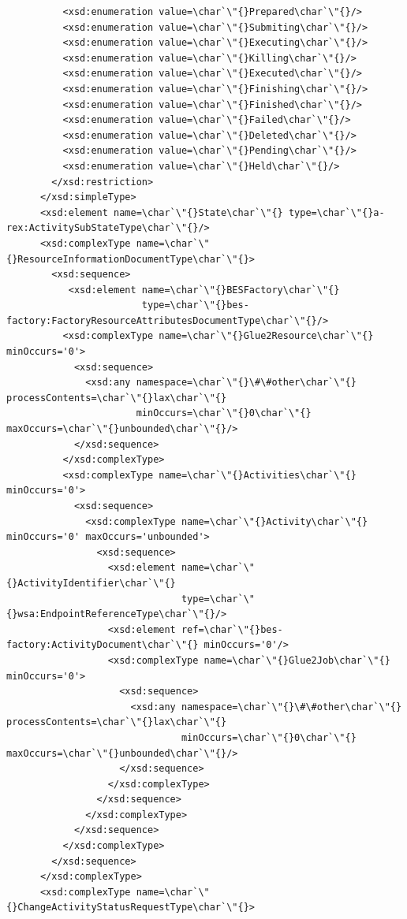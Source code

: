\documentclass{article}                            %
\begin{document}
\begin{footnotesize}
\begin{verbatim}
          <xsd:enumeration value=\char`\"{}Prepared\char`\"{}/>
          <xsd:enumeration value=\char`\"{}Submiting\char`\"{}/>
          <xsd:enumeration value=\char`\"{}Executing\char`\"{}/>
          <xsd:enumeration value=\char`\"{}Killing\char`\"{}/>
          <xsd:enumeration value=\char`\"{}Executed\char`\"{}/>
          <xsd:enumeration value=\char`\"{}Finishing\char`\"{}/>
          <xsd:enumeration value=\char`\"{}Finished\char`\"{}/>
          <xsd:enumeration value=\char`\"{}Failed\char`\"{}/>
          <xsd:enumeration value=\char`\"{}Deleted\char`\"{}/>
          <xsd:enumeration value=\char`\"{}Pending\char`\"{}/>
          <xsd:enumeration value=\char`\"{}Held\char`\"{}/>
        </xsd:restriction>
      </xsd:simpleType>
      <xsd:element name=\char`\"{}State\char`\"{} type=\char`\"{}a-rex:ActivitySubStateType\char`\"{}/>
      <xsd:complexType name=\char`\"{}ResourceInformationDocumentType\char`\"{}>
        <xsd:sequence>
           <xsd:element name=\char`\"{}BESFactory\char`\"{}
                        type=\char`\"{}bes-factory:FactoryResourceAttributesDocumentType\char`\"{}/>
          <xsd:complexType name=\char`\"{}Glue2Resource\char`\"{} minOccurs='0'>
            <xsd:sequence>
              <xsd:any namespace=\char`\"{}\#\#other\char`\"{} processContents=\char`\"{}lax\char`\"{}
                       minOccurs=\char`\"{}0\char`\"{} maxOccurs=\char`\"{}unbounded\char`\"{}/>
            </xsd:sequence>
          </xsd:complexType>
          <xsd:complexType name=\char`\"{}Activities\char`\"{} minOccurs='0'>
            <xsd:sequence>
              <xsd:complexType name=\char`\"{}Activity\char`\"{} minOccurs='0' maxOccurs='unbounded'>
                <xsd:sequence>
                  <xsd:element name=\char`\"{}ActivityIdentifier\char`\"{}
                               type=\char`\"{}wsa:EndpointReferenceType\char`\"{}/>
                  <xsd:element ref=\char`\"{}bes-factory:ActivityDocument\char`\"{} minOccurs='0'/>
                  <xsd:complexType name=\char`\"{}Glue2Job\char`\"{} minOccurs='0'>
                    <xsd:sequence>
                      <xsd:any namespace=\char`\"{}\#\#other\char`\"{} processContents=\char`\"{}lax\char`\"{}
                               minOccurs=\char`\"{}0\char`\"{} maxOccurs=\char`\"{}unbounded\char`\"{}/>
                    </xsd:sequence>
                  </xsd:complexType>
                </xsd:sequence>
              </xsd:complexType>
            </xsd:sequence>
          </xsd:complexType>
        </xsd:sequence>
      </xsd:complexType>
      <xsd:complexType name=\char`\"{}ChangeActivityStatusRequestType\char`\"{}>

\end{verbatim}
\end{footnotesize}
\end{document}

